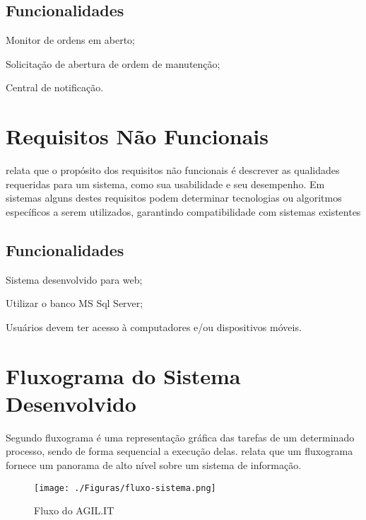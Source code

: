 \subsection{Funcionalidades}
\begin{subalineas}
	\item {Monitor de ordens em aberto};
	\item {Solicitação de abertura de ordem de manutenção};
	\item {Central de notificação}.
\end{subalineas}

\section{Requisitos Não Funcionais}

{\cite{IIBA2005} relata que o propósito dos requisitos não funcionais é descrever as qualidades requeridas para um sistema, como sua usabilidade e seu desempenho. Em sistemas alguns destes requisitos podem determinar tecnologias ou algoritmos específicos a serem utilizados, garantindo compatibilidade com sistemas existentes \cite{cordeiro2007}

\subsection{Funcionalidades}
\begin{subalineas}
	\item {Sistema desenvolvido para web};
	\item {Utilizar o banco MS Sql Server};
	\item {Usuários devem ter acesso à computadores e/ou dispositivos móveis}.
\end{subalineas}

\section{Fluxograma do Sistema Desenvolvido}

{Segundo \cite{pejeronimo2002} fluxograma é uma representação gráfica das tarefas de um determinado processo, sendo de forma sequencial a execução delas. \cite{roberthurt} relata que um fluxograma fornece um panorama de alto nível sobre um sistema de informação.

\newpage
\begin{figure}[htb]
	\caption{\label{flux_sys}Fluxo do AGIL.IT}
	\begin{center}
		\texttt{[image: ./Figuras/fluxo-sistema.png]}
	\end{center}
\end{figure}

}}
